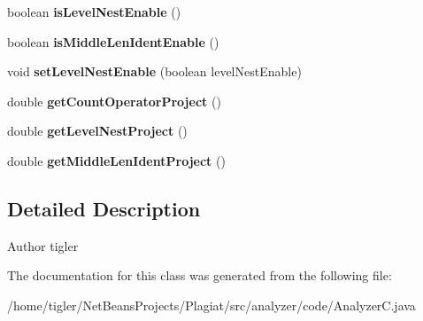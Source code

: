 \begin{DoxyCompactItemize}
boolean {\bfseries is\+Level\+Nest\+Enable} ()
\item 
\mbox{\label{classanalyzer_1_1code_1_1AnalyzerC_a6ec503f9cbfb8f2525b85cfb10a86083}} 
boolean {\bfseries is\+Middle\+Len\+Ident\+Enable} ()
\item 
\mbox{\label{classanalyzer_1_1code_1_1AnalyzerC_a09e0bec3b91561d8f84e734d353ffbd4}} 
void {\bfseries set\+Level\+Nest\+Enable} (boolean level\+Nest\+Enable)
\item 
\mbox{\label{classanalyzer_1_1code_1_1AnalyzerC_ac2f0d9485262b16d1f2910973a2124fe}} 
double {\bfseries get\+Count\+Operator\+Project} ()
\item 
\mbox{\label{classanalyzer_1_1code_1_1AnalyzerC_a3c0b693fe3c90fd7365fdca9331c3d2c}} 
double {\bfseries get\+Level\+Nest\+Project} ()
\item 
\mbox{\label{classanalyzer_1_1code_1_1AnalyzerC_ac2d55c1faee58e2e891bda423d7762a4}} 
double {\bfseries get\+Middle\+Len\+Ident\+Project} ()
\end{DoxyCompactItemize}


\subsection{Detailed Description}
\begin{DoxyAuthor}{Author}
tigler 
\end{DoxyAuthor}


The documentation for this class was generated from the following file\+:\begin{DoxyCompactItemize}
\item 
/home/tigler/\+Net\+Beans\+Projects/\+Plagiat/src/analyzer/code/Analyzer\+C.\+java\end{DoxyCompactItemize}
